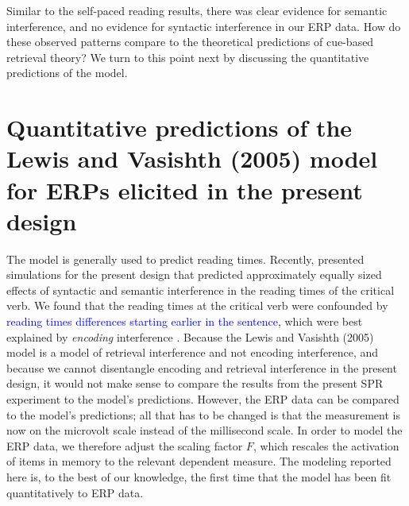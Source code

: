 \documentclass[review,preprint,12pt,authoryear,floatsintext]{elsarticle}
\begin{document}
Similar to the self-paced reading results, there was clear evidence for semantic interference, and no evidence for syntactic interference in our ERP data. How do these observed patterns compare to the theoretical predictions of cue-based retrieval theory? We turn to this point next by discussing the quantitative predictions of the \cite{Lewis2005} model.

\section*{Quantitative predictions of the Lewis and Vasishth (2005) model for ERPs elicited in the present design}

\label{modeling}{The \citet{Lewis2005} model is generally used to predict reading times. Recently, \cite{mertzen} presented simulations for the present design that predicted approximately equally sized effects of syntactic and semantic interference in the reading times of the critical verb. We found that the reading times at the critical verb were confounded by \textcolor{blue}{reading times differences starting earlier in the sentence}, which were best explained by \textit{encoding} interference \citep[see also][]{mertzen}. Because the Lewis and Vasishth (2005) model is a model of retrieval interference and not encoding interference, and because we cannot disentangle encoding and retrieval interference in the present design, it would not make sense to compare the results from the present SPR experiment to the model's predictions. However, the ERP data can be compared to the model's predictions; all that has to be changed is that the measurement is now on the microvolt scale instead of the millisecond scale. In order to model the ERP data, we therefore adjust the scaling factor $F$, which rescales the activation of items in memory to the relevant dependent measure. The modeling reported here is, to the best of our knowledge, the first time that the \citet{Lewis2005} model has been fit quantitatively to ERP data.

}
\end{document}

